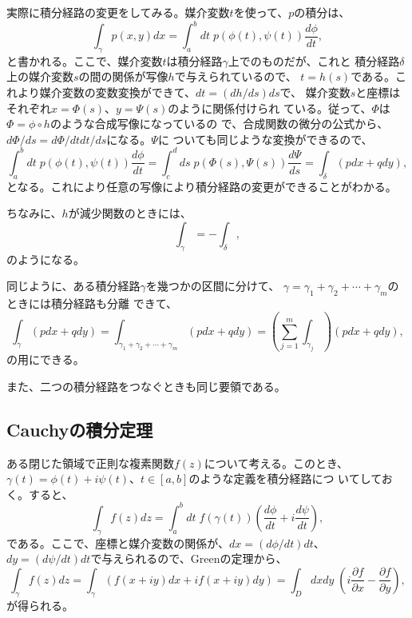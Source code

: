 実際に積分経路の変更をしてみる。媒介変数$t$を使って、$p$の積分は、
\begin{equation}
 \int_{\gamma}p(x, y) dx 
  = \int_{a}^{b}dt\mspace{5mu}p(\phi(t), \psi(t))\frac{d\phi}{dt},
\end{equation}
と書かれる。ここで、媒介変数$t$は積分経路$\gamma$上でのものだが、これと
積分経路$\delta$上の媒介変数$s$の間の関係が写像$h$で与えられているので、
$t=h(s)$である。これより媒介変数の変数変換ができて、$dt = (dh/ds) ds$で、
媒介変数$s$と座標はそれぞれ$x=\Phi(s)$、$y=\Psi(s)$のように関係付けられ
ている。従って、$\Phi$は$\Phi=\phi\circ h$のような合成写像になっているの
で、合成関数の微分の公式から、$d\Phi/ds=d\Phi/dt dt/ds$になる。$\Psi$に
ついても同じような変換ができるので、
\begin{equation}
 \int_{a}^{b}dt\mspace{5mu}p(\phi(t), \psi(t))\frac{d\phi}{dt}
 = \int_{c}^{d}ds\mspace{5mu}p(\Phi(s), \Psi(s))\frac{d\Psi}{ds} 
 = \int_{\delta}(pdx + qdy),
\end{equation}
となる。これにより任意の写像により積分経路の変更ができることがわかる。

ちなみに、$h$が減少関数のときには、
\begin{equation}
 \int_{\gamma} = -\int_{\delta},
\end{equation}
のようになる。

同じように、ある積分経路$\gamma$を幾つかの区間に分けて、
$\gamma=\gamma_1 + \gamma_2 + \cdots + \gamma_m$のときには積分経路も分離
できて、
\begin{equation}
 \int_{\gamma}(pdx+qdy) 
  = \int_{\gamma_1 + \gamma_2 + \cdots + \gamma_m}(pdx+qdy) 
  = \left(\sum_{j=1}^m\int_{\gamma_j}\right)(pdx+qdy) ,
\end{equation}
の用にできる。

また、二つの積分経路をつなぐときも同じ要領である。

\subsection{Cauchyの積分定理}
ある閉じた領域で正則な複素関数$f(z)$について考える。このとき、
$\gamma(t) = \phi (t) + i\psi(t)$、$t\in[a,b]$のような定義を積分経路につ
いてしておく。すると、
\begin{equation}
 \int_{\gamma}f(z)dz 
  = \int_{a}^{b}dt\mspace{5mu}
  f(\gamma(t)) \left(\frac{d\phi}{dt} + i\frac{d\psi}{dt}\right),
\end{equation}
である。ここで、座標と媒介変数の関係が、$dx=(d\phi/dt) dt$、
$dy = (d\psi/dt)dt$で与えられるので、Greenの定理から、
\begin{equation}
 \int_{\gamma}f(z)dz 
  = \int_{\gamma}
  \left(f(x+iy) dx + i f(x+iy) dy\right)
  = \int_{D}dxdy\mspace{5mu}
  \left(i\frac{\partial f}{\partial x} - 
  \frac{\partial f}{\partial y}\right),
\end{equation}
が得られる。

